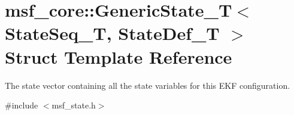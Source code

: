 \hypertarget{structmsf__core_1_1GenericState__T}{\section{msf\-\_\-core\-:\-:Generic\-State\-\_\-\-T$<$ State\-Seq\-\_\-\-T, State\-Def\-\_\-\-T $>$ Struct Template Reference}
\label{structmsf__core_1_1GenericState__T}
}


The state vector containing all the state variables for this E\-K\-F configuration.  




{\ttfamily \#include $<$msf\-\_\-state.\-h$>$}

